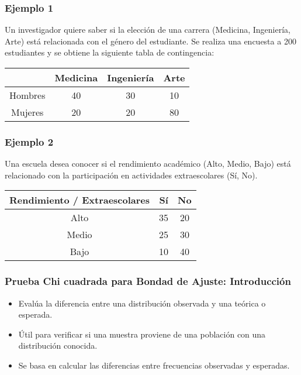 \documentclass[aspectratio=169]{beamer}
\begin{document}
\begin{frame}
\frametitle{Ejemplo 1}

Un investigador quiere saber si la elección de una carrera (Medicina, Ingeniería, Arte) está relacionada con el género del estudiante. Se realiza una encuesta a 200 estudiantes y se obtiene la siguiente tabla de contingencia:

\begin{center}
\begin{tabular}{|c|c|c|c|}
\hline
 & Medicina & Ingeniería & Arte \\
\hline
Hombres & 40 & 30 & 10 \\
\hline
Mujeres & 20 & 20 & 80 \\
\hline
\end{tabular}
\end{center}
\end{frame}


\begin{frame}
\frametitle{Ejemplo 2}

Una escuela desea conocer si el rendimiento académico (Alto, Medio, Bajo) está relacionado con la participación en actividades extraescolares (Sí, No).

\begin{center}
\begin{tabular}{|c|c|c|}
\hline
Rendimiento / Extraescolares & Sí & No \\
\hline
Alto & 35 & 20 \\
\hline
Medio & 25 & 30 \\
\hline
Bajo & 10 & 40 \\
\hline
\end{tabular}
\end{center}

\end{frame}



\begin{frame}
\frametitle{Prueba Chi cuadrada para Bondad de Ajuste: Introducción}
\begin{itemize}
    \item Evalúa la diferencia entre una distribución observada y una teórica o esperada.
    \item Útil para verificar si una muestra proviene de una población con una distribución conocida.
    \item Se basa en calcular las diferencias entre frecuencias observadas y esperadas.
\end{itemize}
\end{frame}
\end{document}
